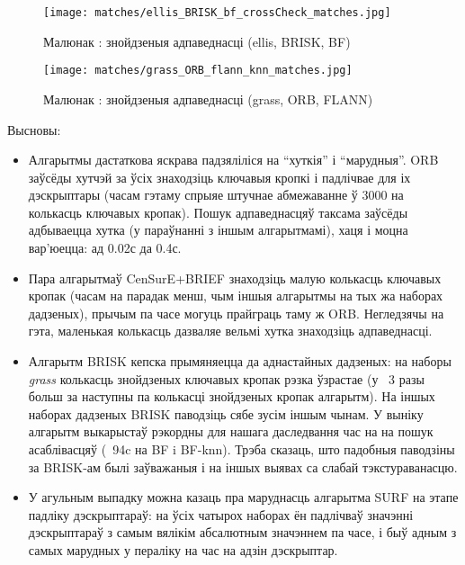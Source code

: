 \begin{figure}[H]
  \centering
  \texttt{[image: matches/ellis\_BRISK\_bf\_crossCheck\_matches.jpg]}
  \captionsetup{labelformat=empty}
  \caption{Малюнак : знойдзеныя адпаведнасці (ellis, BRISK, BF)}
  \label{fig:matches1}
\end{figure}

\begin{figure}[H]
  \centering
  \texttt{[image: matches/grass\_ORB\_flann\_knn\_matches.jpg]}
  \captionsetup{labelformat=empty}
  \caption{Малюнак : знойдзеныя адпаведнасці (grass, ORB, FLANN)}
  \label{fig:matches2}
\end{figure}

Высновы:
\begin{itemize}
  \item Алгарытмы дастаткова яскрава падзяліліся на ``хуткія'' і ``марудныя''. ORB заўсёды хутчэй за ўсіх знаходзіць
  ключавыя кропкі і падлічвае для іх дэскрыптары (часам гэтаму спрыяе штучнае абмежаванне ў 3000 на колькасць
  ключавых кропак). Пошук адпаведнасцяў таксама заўсёды адбываецца хутка (у параўнанні з іншым алгарытмамі),
  хаця і моцна вар'юецца: ад 0.02с да 0.4с.
  \item Пара алгарытмаў CenSurE+BRIEF знаходзіць малую колькасць ключавых кропак (часам на парадак менш, чым іншыя
  алгарытмы на тых жа наборах дадзеных), прычым па часе могуць прайграць таму ж ORB. Негледзячы на гэта, маленькая
  колькасць дазваляе вельмі хутка знаходзіць адпаведнасці.
  \item Алгарытм BRISK кепска прымяняецца да аднастайных дадзеных: на наборы \textit{grass} колькасць знойдзеных ключавых кропак
  рэзка ўзрастае (у ~3 разы больш за наступны па колькасці знойдзеных кропак алгарытм). На іншых наборах дадзеных BRISK
  паводзіць сябе зусім іншым чынам. У выніку алгарытм выкарыстаў рэкордны для нашага даследвання час на на пошук асаблівасцяў
  (~94c на BF i BF-knn). Трэба сказаць, што падобныя паводзіны за BRISK-ам былі заўважаныя і на іншых выявах
  са слабай тэкстураванасцю.
  \item У агульным выпадку можна казаць пра маруднасць алгарытма SURF на этапе падліку дэскрыптараў: на ўсіх чатырох
  наборах ён падлічваў значэнні дэскрыптараў з самым вялікім абсалютным значэннем па часе, і быў адным з самых
  марудных у пераліку на час на адзін дэскрыптар.
\end{itemize}


